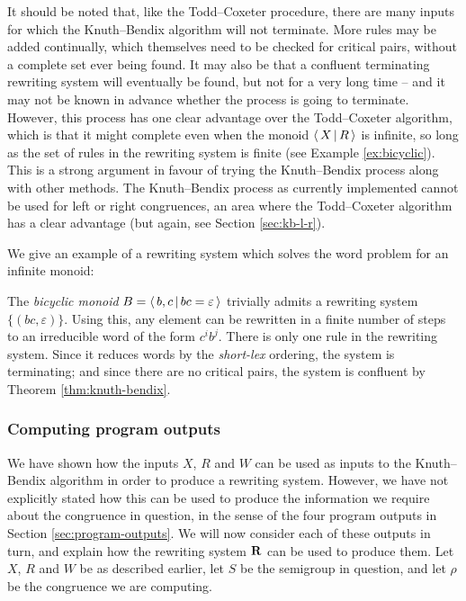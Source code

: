 It should be noted that, like the Todd--Coxeter procedure, there are many inputs
for which the Knuth--Bendix algorithm will not terminate.  More rules may be added continually, which
themselves need to be checked for critical pairs, without a complete set ever
being found.  It may also be that a confluent terminating rewriting system will
eventually be found, but not for a very long time -- and it may not be known in
advance whether the process is going to terminate.  However, this process has
one clear advantage over the Todd--Coxeter algorithm, which is that it might complete even when
the monoid $\left\langle \, X \, \middle| \, R \, \right\rangle$ is infinite, so long as the set of rules in the rewriting
system is finite (see Example \ref{ex:bicyclic}).  This is a strong argument in
favour of trying the Knuth--Bendix process along with other methods.  The
Knuth--Bendix process as currently implemented cannot be used for left or right
congruences, an area where the Todd--Coxeter algorithm has a clear advantage (but again, see
Section \ref{sec:kb-l-r}).

We give an example of a rewriting system which solves the word problem for an
infinite monoid:

\begin{example}
  \label{ex:bicyclic}
  The \textit{bicyclic monoid} $B = \left\langle \, b,c \, \middle| \, bc=\varepsilon \, \right\rangle$ trivially admits
  a rewriting system $\{(bc, \varepsilon)\}$.  Using this, any element can be
  rewritten in a finite number of steps to an irreducible word of the form
  $c^ib^j$.  There is only one rule in the rewriting system.  Since it reduces
  words by the \textit{short-lex} ordering, the system is terminating; and since
  there are no critical pairs, the system is confluent by Theorem
  \ref{thm:knuth-bendix}.
\end{example}

\subsubsection{Computing program outputs}
\label{sec:kb-output}
We have shown how the inputs $X$, $R$ and $W$ can be used as inputs to the
Knuth--Bendix algorithm in order to produce a rewriting system.  However, we
have not explicitly stated how this can be used to produce the information we
require about the congruence in question, in the sense of the four program
outputs in Section \ref{sec:program-outputs}.  We will now consider each of
these outputs in turn, and explain how the rewriting system $\mathbf{R}$ can be used
to produce them.  Let $X$, $R$ and $W$ be as described earlier, let $S$ be the
semigroup in question, and let $\rho$ be the congruence we are computing.

